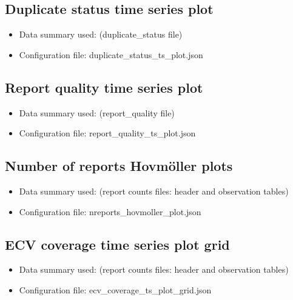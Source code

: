 \documentclass[letterpaper,10pt,english]{sphinxmanual}
\begin{document}
\subsection{Duplicate status time series plot}
\label{\detokenize{index:duplicate-status-time-series-plot}}\begin{itemize}
\item {} 
Data summary used: {\hyperref[\detokenize{index:qi-counts-um-section}]{}} (duplicate\_status file)

\item {} 
Configuration file: duplicate\_status\_ts\_plot.json

\end{itemize}


\subsection{Report quality time series plot}
\label{\detokenize{index:report-quality-time-series-plot}}\begin{itemize}
\item {} 
Data summary used: {\hyperref[\detokenize{index:qi-counts-um-section}]{}} (report\_quality file)

\item {} 
Configuration file: report\_quality\_ts\_plot.json

\end{itemize}


\subsection{Number of reports Hovmöller plots}
\label{\detokenize{index:number-of-reports-hovmoller-plots}}\begin{itemize}
\item {} 
Data summary used: {\hyperref[\detokenize{index:monthly-grids-um-section}]{}} (report counts files: header and observation tables)

\item {} 
Configuration file: nreports\_hovmoller\_plot.json

\end{itemize}


\subsection{ECV coverage time series plot grid}
\label{\detokenize{index:ecv-coverage-time-series-plot-grid}}\begin{itemize}
\item {} 
Data summary used: {\hyperref[\detokenize{index:monthly-grids-um-section}]{}} (report counts files: header and observation tables)

\item {} 
Configuration file: ecv\_coverage\_ts\_plot\_grid.json

\end{itemize}
\end{document}
